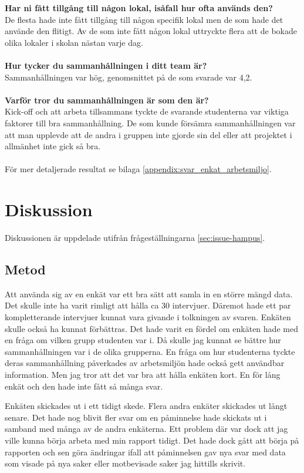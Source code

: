 \textbf{Har ni fått tillgång till någon lokal, isåfall hur ofta används den?}\\
De flesta hade inte fått tillgång till någon specifik lokal men de som hade det använde den flitigt. Av de som inte fått någon lokal uttryckte flera att de bokade olika lokaler i skolan nästan varje dag.\\\\
\textbf{Hur tycker du sammanhållningen i ditt team är?}\\
Sammanhållningen var hög, genomsnittet på de som svarade var 4,2.\\\\
\textbf{Varför tror du sammanhållningen är som den är?}\\
Kick-off och att arbeta tillsammans tyckte de svarande studenterna var viktiga faktorer till bra sammanhållning. De som kunde försämra sammanhållningen var att man upplevde att de andra i gruppen inte gjorde sin del eller att projektet i allmänhet inte gick så bra.\\\\
För mer detaljerade resultat se bilaga \ref{appendix:svar_enkat_arbetsmiljo}.

\section{Diskussion}
\label{sec:discussion-hampus}
Diskussionen är uppdelade utifrån frågeställningarna \ref{sec:issue-hampus}.

\subsection{Metod}
Att använda sig av en enkät var ett bra sätt att samla in en större mängd data. Det skulle inte ha varit rimligt att hålla ca 30 intervjuer. Däremot hade ett par kompletterande intervjuer kunnat vara givande i tolkningen av svaren. Enkäten skulle också ha kunnat förbättras. Det hade varit en fördel om enkäten hade med en fråga om vilken grupp studenten var i. Då skulle jag kunnat se bättre hur sammanhållningen var i de olika grupperna. En fråga om hur studenterna tyckte deras sammanhållning påverkades av arbetsmiljön hade också gett användbar information.	Men jag tror att det var bra att hålla enkäten kort. En för lång enkät och den hade inte fått så många svar. 

Enkäten skickades ut i ett tidigt skede. Flera andra enkäter skickades ut långt senare. Det hade nog blivit fler svar om en påminnelse hade skickats ut i samband med många av de andra enkäterna. Ett problem där var dock att jag ville kunna börja arbeta med min rapport tidigt. Det hade dock gått att börja på rapporten och sen göra ändringar ifall att påminnelsen gav nya svar med data som visade på nya saker eller motbevisade saker jag hittills skrivit. 

